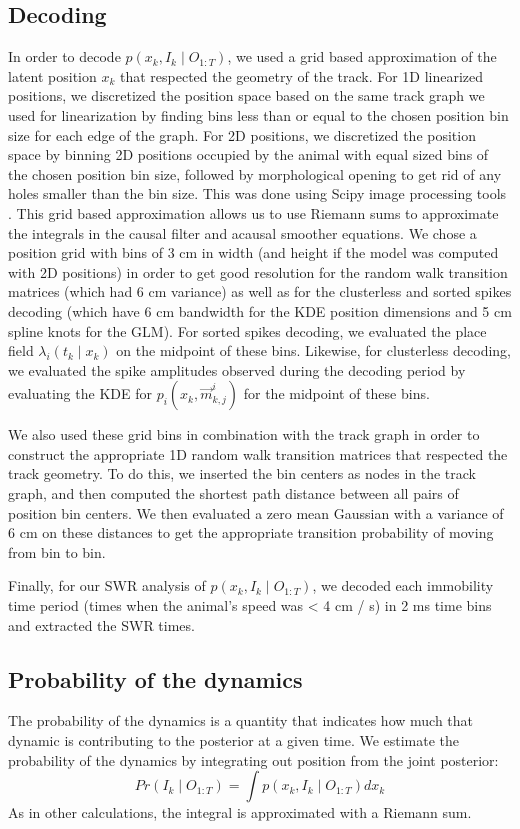 \documentclass[times, twoside]{zHenriquesLab-StyleBioRxiv}
\begin{document}
\subsection*{Decoding}
In order to decode $p(x_{k}, I_{k} \mid O_{1:T})$, we used a grid based approximation of the latent position $x_k$ that respected the geometry of the track. For 1D linearized positions, we discretized the position space based on the same track graph we used for linearization by finding bins less than or equal to the chosen position bin size for each edge of the graph. For 2D positions, we discretized the position space by binning 2D positions occupied by the animal with equal sized bins of the chosen position bin size, followed by morphological opening to get rid of any holes smaller than the bin size. This was done using Scipy image processing tools \cite{SciPy1.0ContributorsSciPyfundamentalalgorithms2020}. This grid based approximation allows us to use Riemann sums to approximate the integrals in the causal filter and acausal smoother equations. We chose a position grid with bins of 3 cm in width (and height if the model was computed with 2D positions) in order to get good resolution for the random walk transition matrices (which had 6 cm variance) as well as for the clusterless and sorted spikes decoding (which have 6 cm bandwidth for the KDE position dimensions and 5 cm spline knots for the GLM). For sorted spikes decoding, we evaluated the place field $\lambda_{i}(t_{k} \mid x_{k})$ on the midpoint of these bins. Likewise, for clusterless decoding, we evaluated the spike amplitudes observed during the decoding period by evaluating the KDE for $p_{i}(x_k, \vec{m}^i_{k,j})$ for the midpoint of these bins.

We also used these grid bins in combination with the track graph in order to construct the appropriate 1D random walk transition matrices that respected the track geometry. To do this, we inserted the bin centers as nodes in the track graph, and then computed the shortest path distance between all pairs of position bin centers. We then evaluated a zero mean Gaussian with a variance of 6 cm on these distances to get the appropriate transition probability of moving from bin to bin.

Finally, for our SWR analysis of $p(x_{k}, I_{k} \mid O_{1:T})$, we decoded each immobility time period (times when the animal's speed was < 4 cm / s) in 2 ms time bins and extracted the SWR times.

\subsection*{Probability of the dynamics}
The probability of the dynamics is a quantity that indicates how much that dynamic is contributing to the posterior at a given time. We estimate the probability of the dynamics by integrating out position from the joint posterior:
$$Pr(I_{k} \mid O_{1:T}) = \int p(x_{k}, I_{k} \mid O_{1:T}) dx_{k}$$
As in other calculations, the integral is approximated with a Riemann sum.
\end{document}
